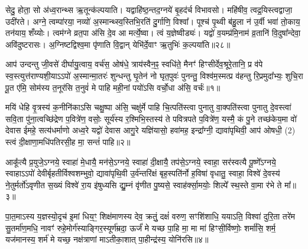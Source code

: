 सेदु॒ होता॒ सो अ॑ध्व॒रान्थ्स ऋ॒तून्क॑ल्पयाति। यद्वा\-हि॑ष्ठ॒न्तद॒ग्नये॑ बृ॒हद॑र्च विभावसो। महि॑षीव॒ त्वद्र॒यिस्त्वद्वाजा॒ उदी॑रते। अग्ने॒ त्वम्पा॑रया॒ नव्यो॑ अ॒स्मान्थ्स्व॒स्तिभि॒रति॑ दु॒र्गाणि॒ विश्वा᳚। पूश्च॑ पृ॒थ्वी ब॑हु॒ला न॑ उ॒र्वी भवा॑ तो॒काय॒ तन॑याय॒ शँय्योः। त्वम॑ग्ने व्रत॒पा अ॑सि दे॒व आ मर्त्ये॒ष्वा। त्वं य॒ज्ञेष्वीड्यः॑। यद्वो॑ व॒यम्प्र॑मि॒नाम॑ व्र॒तानि॑ वि॒दुषा᳚न्देवा॒ अवि॑दुष्टरासः। अ॒ग्निष्टद्विश्व॒मा पृ॑णाति वि॒द्वान् येभि॑र्दे॒वाꣳ ऋ॒तुभिः॑ क॒ल्पया॑ति॥२८॥

{\anuvakamend[{जु॒षेथा॒मा स नो॑ यजा॒दा त्रयो॑विꣳशतिश्च। (14)}]}
{\prashnaend[{इ॒षे त्वा॑ य॒ज्ञस्य॒ शुन्ध॑ध्वं॒ कर्म॑णे दे॒वो\-ऽव॑धूत॒न्धृष्टिः॒ सं व॑पा॒म्या द॑दे॒
प्रत्यु॑ष्टं॒ कृष्णो॑\-ऽसि॒ भुव॑नमसि॒ वाज॑स्यो॒भा वां॒ चतु॑र्दश॥14॥ इ॒षे दृꣳ॑ह॒ भुव॑नम॒ष्टाविꣳ॑शतिः॥28॥ इ॒षे त्वा॑ क॒ल्पया॑ति॥}]}


\setcounter{anuvakam}{0}
आप॑ उन्दन्तु जी॒वसे॑ दीर्घायु॒त्वाय॒ वर्च॑स॒ ओष॑धे॒ त्राय॑स्वैन॒ꣴ॒ स्वधि॑ते॒ मैनꣳ॑ हिꣳसीर्देव॒श्रूरे॒तानि॒ प्र व॑पे स्व॒स्त्युत्त॑राण्यशी॒या\-ऽ\-ऽपो॑ अ॒स्मान्मा॒तरः॑ शुन्धन्तु घृ॒तेन॑ नो घृत॒पुवः॑ पुनन्तु॒ विश्व॑म॒स्मत्प्र व॑हन्तु रि॒प्रमुदा᳚भ्यः॒ शुचि॒रा पू॒त ए॑मि॒ सोम॑स्य त॒नूर॑सि त॒नुवं॑ मे पाहि मही॒नां पयो॑\-ऽसि वर्चो॒धा अ॑सि॒ वर्चः॑॥१॥

मयि॑ धेहि वृ॒त्रस्य॑ क॒नीनि॑का\-ऽसि चक्षु॒ष्पा अ॑सि॒ चक्षु॑र्मे पाहि चि॒त्पति॑स्त्वा पुनातु वा॒क्पति॑स्त्वा पुनातु दे॒वस्त्वा॑ सवि॒ता पु॑ना॒त्वच्छि॑द्रेण प॒वित्रे॑ण॒ वसोः॒ सूर्य॑स्य र॒श्मिभि॒स्तस्य॑ ते पवित्रपते प॒वित्रे॑ण॒ यस्मै॒ कं पु॒ने तच्छ॑केय॒मा वो॑ देवास ईमहे॒ सत्य॑धर्माणो अध्व॒रे यद्वो॑ देवास आगु॒रे यज्ञि॑यासो॒ हवा॑मह॒ इन्द्रा᳚ग्नी॒ द्यावा॑पृथिवी॒ आप॑ ओषधी॒ (2) स्त्वं दी॒क्षाणा॒मधि॑पतिरसी॒ह मा॒ सन्तं॑ पाहि॥२॥

{\anuvakamend[{वर्च॑ ओषधीर॒ष्टौ च॑॥१॥}]}

आकू᳚त्यै प्र॒युजे॒\-ऽग्नये॒ स्वाहा॑ मे॒धायै॒ मन॑से॒\-ऽग्नये॒ स्वाहा॑ दी॒क्षायै॒ तप॑से॒\-ऽग्नये॒ स्वाहा॒ सर॑स्वत्यै पू॒ष्णे᳚\-ऽग्नये॒ स्वाहा\-ऽ\-ऽपो॑ देवीर्बृहतीर्विश्वशम्भुवो॒ द्यावा॑पृथि॒वी उ॒र्व॑न्तरि॑क्षं बृह॒स्पति॑र्नो ह॒विषा॑ वृधातु॒ स्वाहा॒ विश्वे॑ दे॒वस्य॑ ने॒तुर्मर्तो॑\-ऽवृणीत स॒ख्यं विश्वे॑ रा॒य इ॑षुध्यसि द्यु॒म्नं वृ॑णीत पु॒ष्यसे॒ स्वाह॑र्क्सा॒मयोः॒ शिल्पे᳚ स्थ॒स्ते वा॒मा र॑भे ते मा᳚॥३॥

पा॒त॒मा\-ऽस्य य॒ज्ञस्यो॒दृच॑ इ॒मां धिय॒ꣳ॒ शिक्ष॑माणस्य देव॒ क्रतुं॒ दक्षं॑ वरुण॒ सꣳशि॑शाधि॒ यया\-ऽति॒ विश्वा॑ दुरि॒ता तरे॑म सु॒तर्मा॑ण॒मधि॒ नावꣳ॑ रुहे॒मोर्ग॑स्याङ्गिर॒स्यूर्ण॑म्रदा॒ ऊर्जं॑ मे यच्छ पा॒हि मा॒ मा मा॑ हिꣳसी॒र्विष्णोः॒ शर्मा॑सि॒ शर्म॒ यज॑मानस्य॒ शर्म॑ मे यच्छ॒ नक्ष॑त्राणां मा\-ऽतीका॒शात् पा॒हीन्द्र॑स्य॒ योनि॑रसि॥४॥

